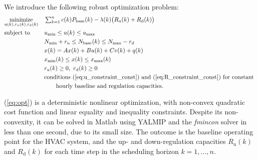 We introduce the following robust optimization problem:
\begin{equation}\label{eq:opt}
\begin{aligned}
& \underset{u(k), r_{\text{u}}(k), r_{\text{d}}(k)}{\text{minimize}} 
& & \textstyle\sum_{k=1}^{n} c(k) P_{\text{base}}(k) - \lambda(k) \big(R_{\text{u}}(k) + R_{\text{d}}(k)\big) \\
& \text{subject to}
& & u_{\text{min}} \leq u(k) \leq u_{\text{max}} \\%
&&& N_{\text{min}} + r_u \leq N_{\text{base}}(k) \leq N_{\text{max}} - r_d \\
&&& x(k) = Ax(k) + Bu(k) + Cv(k) + q(k) \\
&&& x_{\text{min}}(k) \leq x(k) \leq x_{\text{max}}(k)  \\
&&& r_{\text{u}}(k) \geq 0, ~r_{\text{d}}(k) \geq 0\\
&&& \text{conditions~} (\ref{eq:u_constraint_const}) \text{~and~} (\ref{eq:R_constraint_const}) \text{~for constant }\\
&&& \quad\quad \text{hourly baseline and regulation capacities}.
\end{aligned}
\end{equation}

\noindent (\ref{eq:opt}) is a deterministic nonlinear optimization, with non-convex quadratic cost function and linear equality and inequality constraints. Despite its non-convexity, it can be solved in Matlab using YALMIP \cite{Lofberg:2004yalmip} and the \textit{fmincon} solver in less than one second, due to its small size. The outcome is the baseline operating point for the HVAC system, and the up- and down-regulation capacities $R_{\text{u}}(k)$ and $R_{\text{d}}(k)$ for each time step in the scheduling horizon $k = 1, \ldots, n$.



